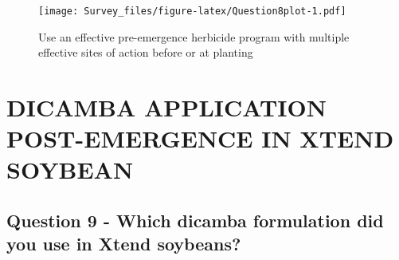 \documentclass[]{article}
\begin{document}
\begin{figure}
\centering
\texttt{[image: Survey\_files/figure-latex/Question8plot-1.pdf]}
\caption{Use an effective pre-emergence herbicide program with multiple
effective sites of action before or at planting}
\end{figure}

\newpage

\section{DICAMBA APPLICATION POST-EMERGENCE IN XTEND
SOYBEAN}\label{dicamba-application-post-emergence-in-xtend-soybean}

\subsection{Question 9 - Which dicamba formulation did you use in Xtend
soybeans?}\label{question-9---which-dicamba-formulation-did-you-use-in-xtend-soybeans}
\end{document}
